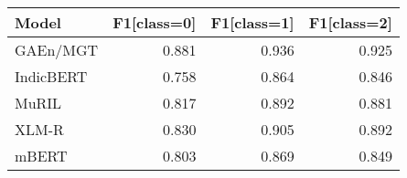 \begin{tabular}{lrrr}
\toprule
Model & F1[class=0] & F1[class=1] & F1[class=2] \\
\midrule
GAEn/MGT & 0.881 & 0.936 & 0.925 \\
IndicBERT & 0.758 & 0.864 & 0.846 \\
MuRIL & 0.817 & 0.892 & 0.881 \\
XLM-R & 0.830 & 0.905 & 0.892 \\
mBERT & 0.803 & 0.869 & 0.849 \\
\bottomrule
\end{tabular}
